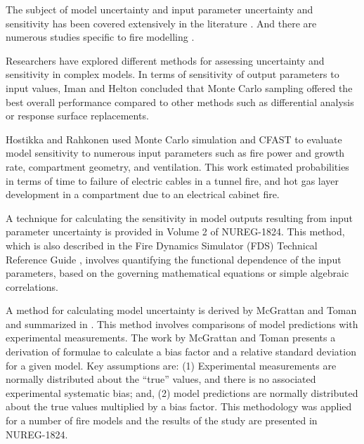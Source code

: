 
The subject of model uncertainty and input parameter uncertainty and sensitivity has been covered extensively in the literature \cite{Spiegel, Vose, Kumamoto, Haimes}.  And there are numerous studies specific to fire modelling \cite{Notarianni:SFPE,  NUREG_1824, McGrattan2011a, Notarianni:1999, Lundin, Hostikka:2003a, Upadhyay2008, FDS_Validation_Guide}.  

Researchers have explored different methods for assessing uncertainty and sensitivity in complex models. In terms of sensitivity of output parameters to input values, Iman and Helton \cite{Iman:1988} concluded that Monte Carlo sampling offered the best overall performance compared to other methods such as differential analysis or response surface replacements.

Hostikka and Rahkonen \cite{Hostikka:2003a} used Monte Carlo simulation and CFAST to evaluate model sensitivity to numerous  input parameters such as fire power and growth rate, compartment geometry, and ventilation. This work estimated probabilities in terms of time to failure of electric cables in a tunnel fire, and hot gas layer development  in a compartment due to an electrical cabinet fire. 

A technique for calculating the sensitivity in model outputs resulting  from input parameter uncertainty is provided in Volume 2 of NUREG-1824. This method, which is also described in the Fire Dynamics Simulator (FDS) Technical Reference Guide \cite{FDS_Validation_Guide}, involves quantifying the functional dependence of the input parameters, based on the governing mathematical equations or simple algebraic correlations. 

A method for calculating model uncertainty is derived by McGrattan and Toman \cite{McGrattan2011a} and summarized in \cite{FDS_Validation_Guide}. This method involves comparisons of model predictions with experimental measurements. The work by McGrattan and Toman \cite{McGrattan2011a} presents a derivation of formulae to calculate  a bias factor and a relative standard deviation for a given model. Key assumptions are: (1) Experimental measurements are normally distributed about the ``true'' values, and there is no associated experimental systematic bias; and, (2)  model predictions are normally distributed about the true values multiplied by a bias factor. This methodology was applied for a number of fire models and the results of the study are presented in NUREG-1824.

